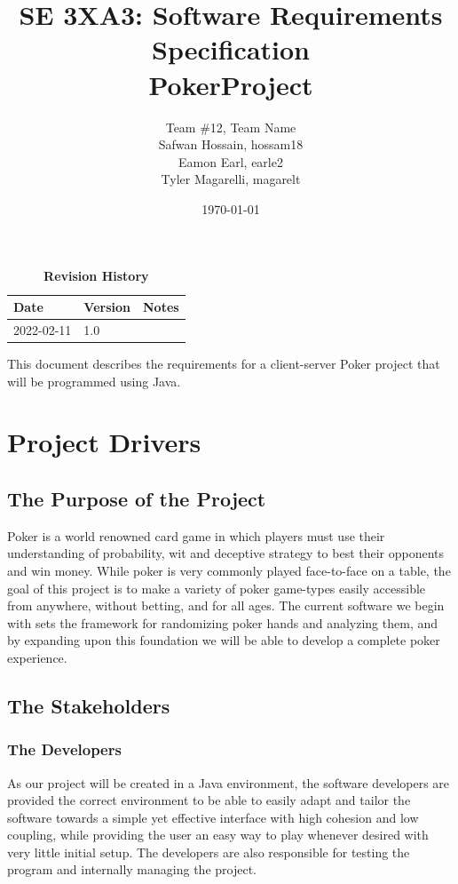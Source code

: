 \documentclass[12pt, titlepage]{article}
\title{SE 3XA3: Software Requirements Specification\\PokerProject}
\author{Team \#12, Team Name
        \\ Safwan Hossain, hossam18
        \\ Eamon Earl, earle2
        \\ Tyler Magarelli, magarelt
}
\date{\today}
\begin{document}
\maketitle

\tableofcontents
\listoftables
\listoffigures

\begin{table}[bp]
\caption{\bf Revision History}
\begin{tabularx}{\textwidth}{p{3cm}p{2cm}X}
\toprule {\bf Date} & {\bf Version} & {\bf Notes}\\
\midrule
2022-02-11 & 1.0 & \\
\bottomrule
\end{tabularx}
\end{table}

\newpage


This document describes the requirements for a client-server Poker project that will be programmed using Java.

\section{Project Drivers}

\subsection{The Purpose of the Project}
Poker is a world renowned card game in which players must use their understanding of probability,
wit and deceptive strategy to best their opponents and win money. While poker is very commonly
played face-to-face on a table, the goal of this project is to make a variety of poker game-types easily
accessible from anywhere, without betting, and for all ages. The current software we begin with sets the framework for randomizing
poker hands and analyzing them, and by expanding upon this foundation we will be able to develop a complete poker
experience.
\subsection{The Stakeholders}

\subsubsection{The Developers}
As our project will be created in a Java environment, the software developers are provided the correct environment to be able to easily adapt and tailor the software towards a simple yet effective interface with high cohesion and low coupling,
while providing the user an easy way to play whenever desired with very little initial setup. The developers are also responsible for testing the program and internally managing the project.
\end{document}
